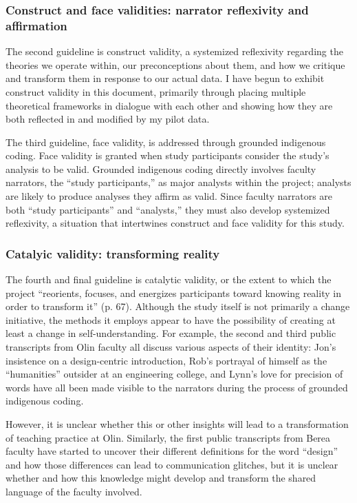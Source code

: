 \subsubsection{Construct and face validities: narrator reflexivity and affirmation}

The second guideline is construct validity, a systemized reflexivity regarding the theories we operate within, our preconceptions about them, and how we critique and transform them in response to our actual data. I have begun to exhibit construct validity in this document, primarily through placing multiple theoretical frameworks in dialogue with each other and showing how they are both reflected in and modified by my pilot data. 

The third guideline, face validity, is addressed through grounded indigenous coding. Face validity is granted when study participants consider the study’s analysis to be valid. Grounded indigenous coding directly involves faculty narrators, the “study participants,” as major analysts within the project; analysts are likely to produce analyses they affirm as valid. Since faculty narrators are both “study participants” and “analysts,” they must also develop systemized reflexivity, a situation that intertwines construct and face validity for this study.

\subsubsection{Catalyic validity: transforming reality}

The fourth and final guideline is catalytic validity, or the extent to which the project “reorients, focuses, and energizes participants toward knowing reality in order to transform it” (p. 67). Although the study itself is not primarily a change initiative, the methods it employs appear to have the possibility of creating at least a change in self-understanding. For example, the second and third public transcripts from Olin faculty all discuss various aspects of their identity: Jon’s insistence on a design-centric introduction, Rob’s portrayal of himself as the “humanities” outsider at an engineering college, and Lynn’s love for precision of words have all been made visible to the narrators during the process of grounded indigenous coding. 

However, it is unclear whether this or other insights will lead to a transformation of teaching practice at Olin. Similarly, the first public transcripts from Berea faculty have started to uncover their different definitions for the word “design” and how those differences can lead to communication glitches, but it is unclear whether and how this knowledge might develop and transform the shared language of the faculty involved.

